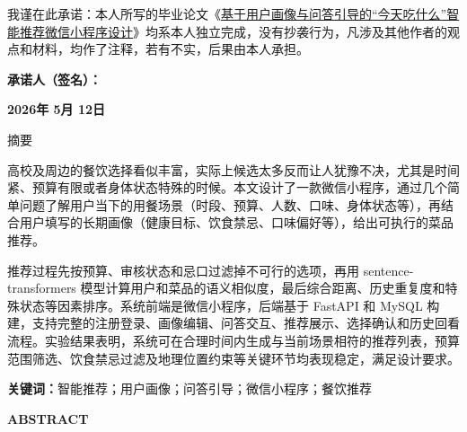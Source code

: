 \documentclass[a4paper,12pt,oneside,openany]{ctexbook}
\begin{document}
\songti
\setlength{\parindent}{2em}
我谨在此承诺：本人所写的毕业论文《\uline{\hspace{0.3em}基于用户画像与问答引导的“今天吃什么”智能推荐微信小程序设计\hspace{0.3em}}》均系本人独立完成，没有抄袭行为，凡涉及其他作者的观点和材料，均作了注释，若有不实，后果由本人承担。

\vspace{1cm}

\begin{flushright}
\songti
\setlength{\parindent}{0em}
{\heiti\textbf{承诺人（签名）：}}\CJKunderline{\makebox[5cm]{}}

\vspace{1cm}

{\heiti\textbf{2026年 5月 12日}}
\end{flushright}
\clearpage

\clearpage
\thispagestyle{tocstyle} %

\begin{center}
\vspace*{-0.5\baselineskip}
{\heiti 摘\quad 要}
\end{center}
\songti

高校及周边的餐饮选择看似丰富，实际上候选太多反而让人犹豫不决，尤其是时间紧、预算有限或者身体状态特殊的时候。本文设计了一款微信小程序，通过几个简单问题了解用户当下的用餐场景（时段、预算、人数、口味、身体状态等），再结合用户填写的长期画像（健康目标、饮食禁忌、口味偏好等），给出可执行的菜品推荐。

推荐过程先按预算、审核状态和忌口过滤掉不可行的选项，再用 sentence-transformers 模型计算用户和菜品的语义相似度，最后综合距离、历史重复度和特殊状态等因素排序。系统前端是微信小程序，后端基于 FastAPI 和 MySQL 构建，支持完整的注册登录、画像编辑、问答交互、推荐展示、选择确认和历史回看流程。实验结果表明，系统可在合理时间内生成与当前场景相符的推荐列表，预算范围筛选、饮食禁忌过滤及地理位置约束等关键环节均表现稳定，满足设计要求。

\vspace{\baselineskip}
\noindent\textbf{\heiti{}关键词：}{\songti 智能推荐；用户画像；问答引导；微信小程序；餐饮推荐}

\clearpage
\thispagestyle{tocstyle} %
\begin{center}
\vspace*{-0.5\baselineskip}
{\bfseries ABSTRACT}
\end{center}
\normalfont
\end{document}

